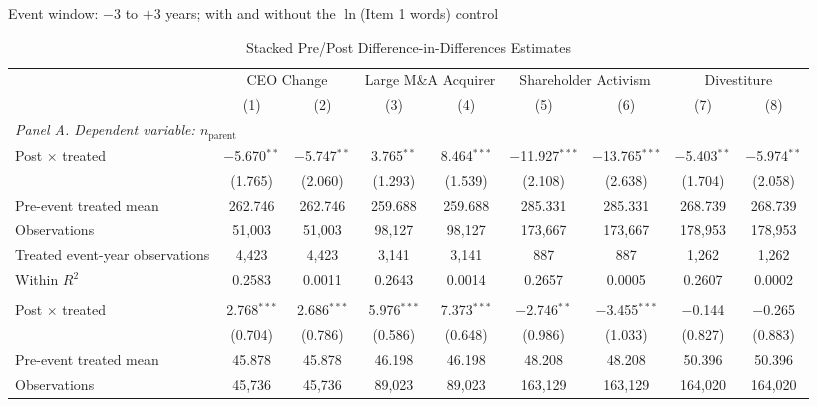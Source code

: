 \begin{landscape}
\begin{table}[H]
\centering
\caption{Stacked Pre/Post Difference-in-Differences Estimates}
\label{tab:did_item1}
{\small Event window: $-3$ to $+3$ years; with and without the $\ln$(Item 1 words) control}\\[4pt]
\begin{adjustbox}{max width=\linewidth, max totalheight=0.62\textheight}
\begin{tabular}{lcccccccc}
\toprule
 & \multicolumn{2}{c}{CEO Change} & \multicolumn{2}{c}{Large M\&A Acquirer} & \multicolumn{2}{c}{Shareholder Activism} & \multicolumn{2}{c}{Divestiture} \\
\cmidrule(lr){2-3} \cmidrule(lr){4-5} \cmidrule(lr){6-7} \cmidrule(lr){8-9}
 & (1) & (2) & (3) & (4) & (5) & (6) & (7) & (8) \\
\midrule
\multicolumn{9}{l}{\textit{Panel A. Dependent variable: $n_{\mathrm{parent}}$}} \\[2pt]
Post $\times$ treated & $-$5.670$^{**}$ & $-$5.747$^{**}$ & 3.765$^{**}$ & 8.464$^{***}$ & $-$11.927$^{***}$ & $-$13.765$^{***}$ & $-$5.403$^{**}$ & $-$5.974$^{**}$ \\
 & (1.765) & (2.060) & (1.293) & (1.539) & (2.108) & (2.638) & (1.704) & (2.058) \\
Pre-event treated mean & 262.746 & 262.746 & 259.688 & 259.688 & 285.331 & 285.331 & 268.739 & 268.739 \\
Observations & 51,003 & 51,003 & 98,127 & 98,127 & 173,667 & 173,667 & 178,953 & 178,953 \\
Treated event-year observations & 4,423 & 4,423 & 3,141 & 3,141 & 887 & 887 & 1,262 & 1,262 \\
Within $R^2$ & 0.2583 & 0.0011 & 0.2643 & 0.0014 & 0.2657 & 0.0005 & 0.2607 & 0.0002 \\
\cmidrule(l){1-9}
\addlinespace[4pt]
\multicolumn{9}{l}{\textit{Panel B. Dependent variable: Parents entering}} \\[2pt]
Post $\times$ treated & 2.768$^{***}$ & 2.686$^{***}$ & 5.976$^{***}$ & 7.373$^{***}$ & $-$2.746$^{**}$ & $-$3.455$^{***}$ & $-$0.144 & $-$0.265 \\
 & (0.704) & (0.786) & (0.586) & (0.648) & (0.986) & (1.033) & (0.827) & (0.883) \\
Pre-event treated mean & 45.878 & 45.878 & 46.198 & 46.198 & 48.208 & 48.208 & 50.396 & 50.396 \\
Observations & 45,736 & 45,736 & 89,023 & 89,023 & 163,129 & 163,129 & 164,020 & 164,020 \\

\end{tabular}
\end{adjustbox}
\end{table}
\end{landscape}
